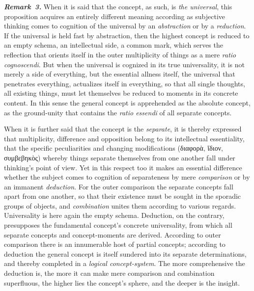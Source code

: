 \documentclass[12pt]{book}
\newcommand{\anm}[1]{\emph{\textbf{Remark~#1.}}}
\begin{document}
\anm{3} When it is said that the concept, as such, is \emph{the universal},
this proposition acquires an entirely different meaning according as
subjective thinking comes to cognition of the universal by an
\emph{abstraction} or by a \emph{reduction}. If the universal is held fast
by abstraction, then the highest concept is reduced to an empty schema, an
intellectual side, a common mark, which serves the reflection that orients
itself in the outer multiplicity of things as a mere \textit{ratio
cognoscendi}. But when the universal is cognized in its true universality,
it is not merely a side of everything, but the essential allness itself, the
universal that penetrates everything, actualizes itself in everything, so
that all single thoughts, all existing things, must let themselves be
reduced to moments in its concrete content. In this sense the general
concept is apprehended as the absolute concept, as the ground-unity that
contains the \textit{ratio essendi} of all separate concepts.

When it is further said that the concept is the \emph{separate}, it is
thereby expressed that multiplicity, difference and opposition belong to its
intellectual essentiality, that the specific peculiarities and changing
modifications (διαφορὰ, ἴδιον, συμβεβηκὸς) whereby things separate
themselves from one another fall under thinking's point of view. Yet in this
respect too it makes an essential difference whether the subject comes to
cognition of separateness by mere \emph{comparison} or by an immanent
\emph{deduction}. For the outer comparison the separate concepts fall apart
from one another, so that their existence must be sought in the sporadic
groups of objects, and \emph{combination} unites them according to various
regards. Universality is here again the empty schema. Deduction, on the
contrary, presupposes the fundamental concept's concrete universality, from
which all separate concepts and concept-moments are derived. According to
outer comparison there is an innumerable host of partial concepts; according
to deduction the general concept is itself sundered into its separate
determinations, and thereby completed in a \emph{logical concept-system}.
The more comprehensive the deduction is, the more it can make mere
comparison and combination superfluous, the higher lies the concept's
sphere, and the deeper is the insight.
\end{document}
